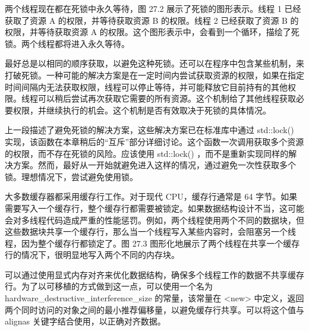 两个线程现在都在死锁中永久等待，图 27.2 展示了死锁的图形表示。线程 1 已经获取了资源 A 的权限，并等待获取资源 B 的权限。线程 2 已经获取了资源 B 的权限，并等待获取资源 A 的权限。这个图形表示中，会看到一个循环，描绘了死锁。两个线程都将进入永久等待。


最好总是以相同的顺序获取，以避免这种死锁。还可以在程序中包含某些机制，来打破死锁。一种可能的解决方案是在一定时间内尝试获取资源的权限，如果在指定时间间隔内无法获取权限，线程可以停止等待，并可能释放它目前持有的其他权限。线程可以稍后尝试再次获取它需要的所有资源。这个机制给了其他线程获取必要权限，并继续执行的机会。这个机制是否有效取决于死锁的具体情况。

上一段描述了避免死锁的解决方案，这些解决方案已在标准库中通过 std::lock() 实现，该函数在本章稍后的“互斥”部分详细讨论。这个函数一次调用获取多个资源的权限，而不存在死锁的风险。应该使用 std::lock() ，而不是重新实现同样的解决方案。然而，最好从一开始就避免进入这样的情况，通过避免一次性获取多个锁。理想情况下，尝试避免使用锁。


大多数缓存器都采用缓存行工作。对于现代 CPU，缓存行通常是 64 字节。如果需要写入一个缓存行，整个缓存行都需要被锁定。如果数据结构设计不当，这可能会对多线程代码造成严重的性能惩罚。例如，两个线程使用两个不同的数据块，但这些数据块共享一个缓存行，那么当一个线程写入某些内容时，会阻塞另一个线程，因为整个缓存行都锁定了。图 27.3 图形化地展示了两个线程在共享一个缓存行的情况下，很明显地写入两个不同的内存块。


可以通过使用显式内存对齐来优化数据结构，确保多个线程工作的数据不共享缓存行。为了以可移植的方式做到这一点，可以使用一个名为 hardware\_destructive\_interference\_size 的常量，该常量在 <new> 中定义，返回两个同时访问的对象之间的最小推荐偏移量，以避免缓存行共享。可以将这个值与 alignas 关键字结合使用，以正确对齐数据。







